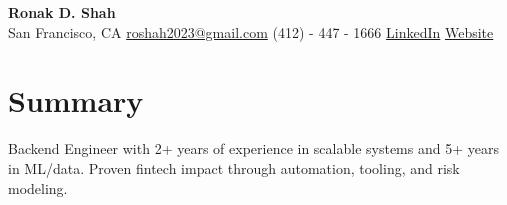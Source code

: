 \documentclass[letterpaper,10pt]{article}
\begin{document}
\begin{center}
    \textbf{\Huge Ronak D. Shah}\\
    San Francisco, CA \hspace{1em} \href{mailto:roshah2023@gmail.com}{roshah2023@gmail.com} \hspace{1em} (412) - 447 - 1666 \hspace{1em} \href{http://www.linkedin.com/in/ronakshah52}{LinkedIn} \hspace{1em} \href{https://ronakdshah.github.io/}{Website}
\end{center}
\section*{Summary}
Backend Engineer with 2+ years of experience in scalable systems and 5+ years in ML/data. Proven fintech impact through automation, tooling, and risk modeling.
\end{document}
